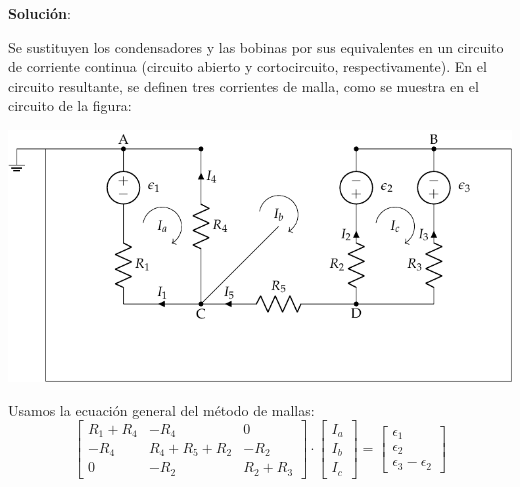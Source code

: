 \documentclass[10pt]{article}
\begin{document}
\vspace{3mm}

\hrulefill

\vspace{5mm}
\textbf{Solución}:
\vspace{4mm}

Se sustituyen los condensadores y las bobinas por sus equivalentes en un circuito de corriente continua (circuito abierto y cortocircuito, respectivamente). En el circuito resultante, se definen tres corrientes de malla, como se muestra en el circuito de la figura:

\begin{center}
  \includegraphics[scale=1.08]{figs/mallas_condensadores_sol.pdf}
\end{center}

Usamos la ecuación general del método de mallas:    
\begin{equation*}
    \begin{bmatrix}
        R_1 + R_4 & -R_4 & 0\\
        -R_4 & R_4 + R_5 + R_2 & -R_{2}\\
        0 & -R_2 & R_2 + R_3
    \end{bmatrix} \cdot %
    \begin{bmatrix}
        I_{a}\\
        I_{b}\\
        I_{c}
    \end{bmatrix} = %
    \begin{bmatrix}
        \epsilon_1\\
        \epsilon_2\\
        \epsilon_3 - \epsilon_2
    \end{bmatrix}
\end{equation*} 
\end{document}
